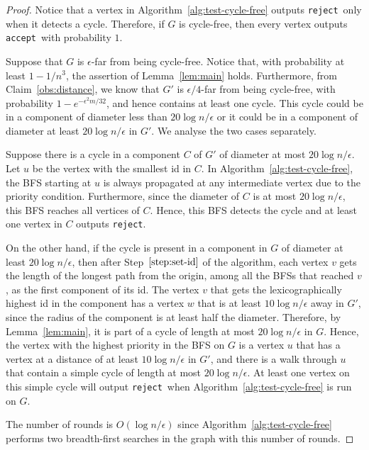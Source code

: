 \documentclass[11pt]{article}
\newcommand{\accept}{\texttt{accept}}
\newcommand{\reject}{\texttt{reject}}
\begin{document}
\begin{proof}
    Notice that a vertex in Algorithm~\ref{alg:test-cycle-free} outputs \reject~only when it detects a cycle.
      Therefore, if $G$ is cycle-free, then every vertex outputs \accept~with probability $1$.

      Suppose that $G$ is $\epsilon$-far from being cycle-free. Notice that, with probability at
      least $1 - 1/n^3$, the assertion of Lemma~\ref{lem:main} holds.  Furthermore, from
      Claim~\ref{obs:distance}, we know that $G'$ is $\epsilon/4$-far from being cycle-free,
      with probability $1-e^{-\epsilon^2 m/32}$, and hence contains at least one cycle.  This cycle
      could be in a component of diameter less than $20\log n/\epsilon$ or it could be in a
      component of diameter at least $20\log n/\epsilon$ in $G'$. We analyse the two cases
      separately.

      Suppose there is a cycle in a component $C$ of $G'$ of diameter at most $20\log n/\epsilon$. Let $u$
      be the vertex with the smallest id in $C$. In Algorithm~\ref{alg:test-cycle-free}, the BFS
      starting at $u$ is always propagated at any intermediate vertex due to the priority
      condition. Furthermore, since the diameter of $C$ is at most $20\log n/\epsilon$, this BFS
      reaches all vertices of $C$.  Hence, this BFS detects the cycle and at least one vertex
      in $C$ outputs \reject.

      On the other hand, if the cycle is present in a component in $G$ of diameter at least $20\log
      n/\epsilon$, then after Step~$\ref{step:set-id}$ of the algorithm, each vertex $v$ gets the
      length of the longest path from the origin, among all the BFSs that reached $v$, as the
      first component of its id. The vertex $v$ that gets the lexicographically highest id in the
      component has a vertex $w$ that is at least $10\log n/\epsilon$ away in $G'$, since the radius
      of the component is at least half the diameter. Therefore, by Lemma~\ref{lem:main}, it is part
      of a cycle of length at most $20\log n/\epsilon$ in $G$. Hence, the vertex with the highest
      priority in the BFS on $G$ is a vertex $u$ that has a vertex at a distance of at least $10\log
      n/\epsilon$ in $G'$, and there is a walk through $u$ that contain a simple cycle of length at
      most $20\log n/\epsilon$. At least one vertex on this simple cycle will output \reject~when
      Algorithm~\ref{alg:test-cycle-free} is run on $G$.


      The number of rounds is $O(\log n/\epsilon)$ since Algorithm~\ref{alg:test-cycle-free}
      performs two breadth-first searches in the graph with this number of rounds.\end{proof}
\end{document}
